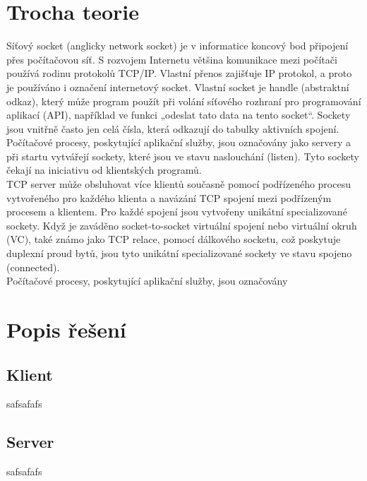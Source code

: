 \documentclass[11pt]{article}
\begin{document}
	\section{Trocha teorie}
	\begin{flushleft}
		Síťový socket (anglicky network socket) je v informatice koncový bod připojení přes počítačovou síť. S rozvojem Internetu většina komunikace mezi počítači používá rodinu protokolů TCP/IP. Vlastní přenos zajišťuje IP protokol, a proto je používáno i označení internetový socket. Vlastní socket je handle (abstraktní odkaz), který může program použít při volání síťového rozhraní pro programování aplikací (API), například ve funkci „odeslat tato data na tento socket“. Sockety jsou vnitřně často jen celá čísla, která odkazují do tabulky aktivních spojení.\\[0.5 cm]
		
		Počítačové procesy, poskytující aplikační služby, jsou označovány jako servery a při startu vytvářejí sockety, které jsou ve stavu naslouchání (listen). Tyto sockety čekají na iniciativu od klientských programů.\\[0.5 cm]
		
		TCP server může obsluhovat více klientů současně pomocí podřízeného procesu vytvořeného pro každého klienta a navázání TCP spojení mezi podřízeným procesem a klientem. Pro každé spojení jsou vytvořeny unikátní specializované sockety. Když je zaváděno socket-to-socket virtuální spojení nebo virtuální okruh (VC), také známo jako TCP relace, pomocí dálkového socketu, což poskytuje duplexní proud bytů, jsou tyto unikátní specializované sockety ve stavu spojeno (connected).\\[0.5 cm]
		Počítačové procesy, poskytující aplikační služby, jsou označovány 			
	\end{flushleft}
	
	\newpage
	\section{Popis řešení}
		\subsection{Klient}
			\begin{flushleft}
				safsafafs \par			
			\end{flushleft}
			
		\subsection{Server}
			\begin{flushleft}
				safsafafs \par			
			\end{flushleft}	
\end{document}
